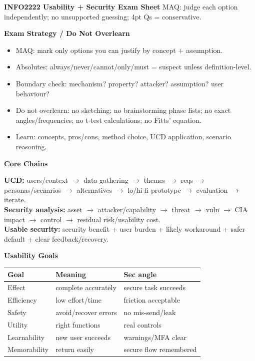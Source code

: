 \documentclass[8pt]{extarticle}
\newcommand{\h}[1]{\vspace{1pt}\textbf{#1}\par}
\begin{document}
\tiny
\begin{center}
\textbf{INFO2222 Usability + Security Exam Sheet} \quad
MAQ: judge each option independently; no unsupported guessing; 4pt Qs = conservative.
\end{center}
\vspace{-5pt}
\begin{multicols*}{5}

\h{Exam Strategy / Do Not Overlearn}
\begin{itemize}
  \item MAQ: mark only options you can justify by concept + assumption.
  \item Absolutes: always/never/cannot/only/must = suspect unless definition-level.
  \item Boundary check: mechanism? property? attacker? assumption? user behaviour?
  \item Do not overlearn: no sketching; no brainstorming phase lists; no exact angles/frequencies; no t-test calculations; no Fitts' equation.
  \item Learn: concepts, pros/cons, method choice, UCD application, scenario reasoning.
\end{itemize}

\h{Core Chains}
\textbf{UCD:} users/context $\to$ data gathering $\to$ themes $\to$ reqs $\to$ personas/scenarios $\to$ alternatives $\to$ lo/hi-fi prototype $\to$ evaluation $\to$ iterate.\\
\textbf{Security analysis:} asset $\to$ attacker/capability $\to$ threat $\to$ vuln $\to$ CIA impact $\to$ control $\to$ residual risk/usability cost.\\
\textbf{Usable security:} security benefit + user burden + likely workaround + safer default + clear feedback/recovery.

\h{Usability Goals}
\begin{tabularx}{\linewidth}{@{}lYY@{}}
\toprule
Goal & Meaning & Sec angle\\ \midrule
Effect & complete accurately & secure task succeeds\\
Efficiency & low effort/time & friction acceptable\\
Safety & avoid/recover errors & no mis-send/leak\\
Utility & right functions & real controls\\
Learnability & new user succeeds & warnings/MFA clear\\
Memorability & return easily & secure flow remembered\\
\bottomrule
\end{tabularx}


\end{multicols*}
\end{document}
